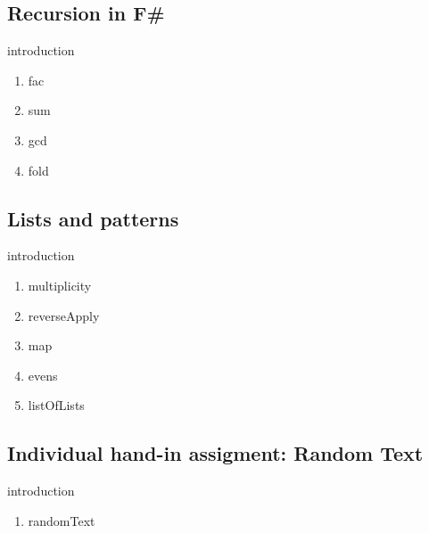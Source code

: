 \documentclass[a4paper,12pt]{article}
\begin{document}
\subsection{Recursion in F\#}
{introduction}
\begin{enumerate}
\item {fac}
\item {sum}
\item {gcd}
\item {fold}
\end{enumerate}
\subsection{Lists and patterns}
{introduction}
\begin{enumerate}
\item {multiplicity}
\item {reverseApply}
\item {map}
\item {evens}
\item {listOfLists}
\end{enumerate}
\subsection{Individual hand-in assigment: Random Text}
{introduction}
\begin{enumerate}
\item {randomText}
\end{enumerate}
\end{document}
